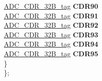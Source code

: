 \begin{DoxyCompactItemize}
\begin{tabbing}
\>\>\mbox{\hyperlink{unionADC__CDR__32B__tag}{ADC\_CDR\_32B\_tag}} {\bfseries CDR90}\\
\>\>\mbox{\hyperlink{unionADC__CDR__32B__tag}{ADC\_CDR\_32B\_tag}} {\bfseries CDR91}\\
\>\>\mbox{\hyperlink{unionADC__CDR__32B__tag}{ADC\_CDR\_32B\_tag}} {\bfseries CDR92}\\
\>\>\mbox{\hyperlink{unionADC__CDR__32B__tag}{ADC\_CDR\_32B\_tag}} {\bfseries CDR93}\\
\>\>\mbox{\hyperlink{unionADC__CDR__32B__tag}{ADC\_CDR\_32B\_tag}} {\bfseries CDR94}\\
\>\>\mbox{\hyperlink{unionADC__CDR__32B__tag}{ADC\_CDR\_32B\_tag}} {\bfseries CDR95}\\
\>\} \\
\}; \\


\end{tabbing}
\end{DoxyCompactItemize}
